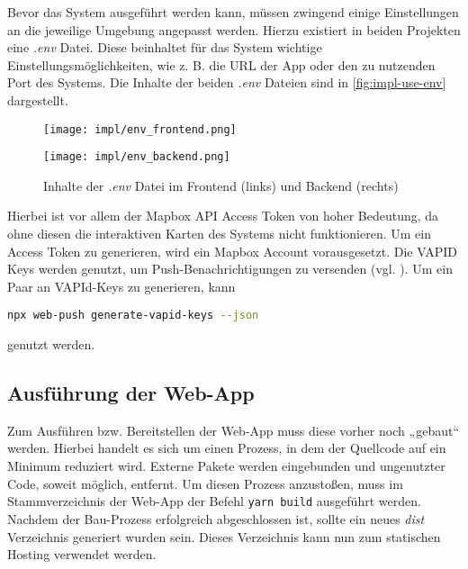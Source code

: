 Bevor das System ausgeführt werden kann, müssen zwingend einige Einstellungen an
die jeweilige Umgebung angepasst werden. Hierzu existiert in beiden Projekten
eine \textit{.env} Datei. Diese beinhaltet für das System wichtige
Einstellungsmöglichkeiten, wie z. B. die URL der App oder den zu nutzenden Port
des Systems. Die Inhalte der beiden \textit{.env} Dateien sind in
\autoref{fig:impl-use-env} dargestellt.

\begin{figure}[htpb]
    \centering
    \begin{minipage}{.55\textwidth}
        \centering
        \texttt{[image: impl/env\_frontend.png]}
    \end{minipage}%
    \begin{minipage}{.45\textwidth}
        \centering
        \texttt{[image: impl/env\_backend.png]}
    \end{minipage}
    \caption{Inhalte der \textit{.env} Datei im Frontend (links) und Backend (rechts)}
    \label{fig:impl-use-env}
\end{figure}

Hierbei ist vor allem der Mapbox API Access Token von hoher Bedeutung, da ohne
diesen die interaktiven Karten des Systems nicht funktionieren. Um ein Access
Token zu generieren, wird ein Mapbox Account vorausgesetzt. Die VAPID Keys
werden genutzt, um Push-Benachrichtigungen zu versenden (vgl.
). Um ein Paar an VAPId-Keys zu generieren, kann

\lstinline[style=code, language=bash, style=inline]{npx web-push generate-vapid-keys --json}

genutzt werden.

\subsection{Ausführung der Web-App}


Zum Ausführen bzw. Bereitstellen der Web-App muss diese vorher noch „gebaut“
werden. Hierbei handelt es sich um einen Prozess, in dem der Quellcode auf ein
Minimum reduziert wird. Externe Pakete werden eingebunden und ungenutzter Code,
soweit möglich, entfernt. Um diesen Prozess anzustoßen, muss im
Stammverzeichnis der Web-App der Befehl \lstinline[style=code, language=bash, style=inline]{yarn build} ausgeführt werden. Nachdem der Bau-Prozess erfolgreich
abgeschlossen ist, sollte ein neues \textit{dist} Verzeichnis generiert wurden
sein. Dieses Verzeichnis kann nun zum statischen Hosting verwendet werden.

